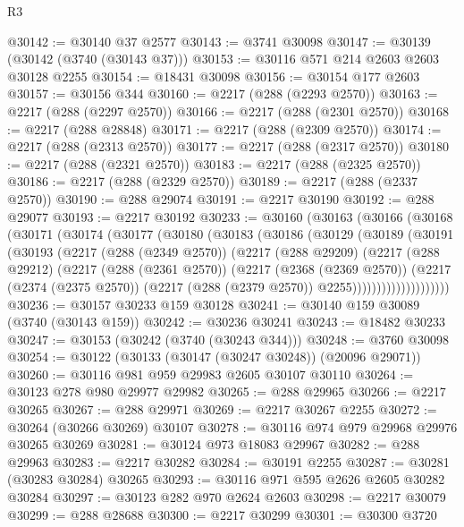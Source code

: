 \begin{lexlean}{R3}
\begin{coremodule}
@30142 := @30140 @37 @2577
@30143 := @3741 @30098
@30147 := @30139 (@30142 (@3740 (@30143 @37)))
@30153 := @30116 @571 @214 @2603 @2603 @30128 @2255
@30154 := @18431 @30098
@30156 := @30154 @177 @2603
@30157 := @30156 @344
@30160 := @2217 (@288 (@2293 @2570))
@30163 := @2217 (@288 (@2297 @2570))
@30166 := @2217 (@288 (@2301 @2570))
@30168 := @2217 (@288 @28848)
@30171 := @2217 (@288 (@2309 @2570))
@30174 := @2217 (@288 (@2313 @2570))
@30177 := @2217 (@288 (@2317 @2570))
@30180 := @2217 (@288 (@2321 @2570))
@30183 := @2217 (@288 (@2325 @2570))
@30186 := @2217 (@288 (@2329 @2570))
@30189 := @2217 (@288 (@2337 @2570))
@30190 := @288 @29074
@30191 := @2217 @30190
@30192 := @288 @29077
@30193 := @2217 @30192
@30233 := @30160
    (@30163
      (@30166
        (@30168
          (@30171
            (@30174
              (@30177
                (@30180
                  (@30183
                    (@30186
                      (@30129
                        (@30189
                          (@30191
                            (@30193
                              (@2217
                                (@288 (@2349 @2570))
                                (@2217
                                  (@288 @29209)
                                  (@2217
                                    (@288 @29212)
                                    (@2217
                                      (@288 (@2361 @2570))
                                      (@2217
                                        (@2368 (@2369 @2570))
                                        (@2217
                                          (@2374 (@2375 @2570))
                                          (@2217 (@288 (@2379 @2570)) @2255))))))))))))))))))))
@30236 := @30157 @30233 @159 @30128
@30241 := @30140 @159 @30089 (@3740 (@30143 @159))
@30242 := @30236 @30241
@30243 := @18482 @30233
@30247 := @30153 (@30242 (@3740 (@30243 @344)))
@30248 := @3760 @30098
@30254 := @30122 (@30133 (@30147 (@30247 @30248)) (@20096 @29071))
@30260 := @30116 @981 @959 @29983 @2605 @30107 @30110
@30264 := @30123 @278 @980 @29977 @29982
@30265 := @288 @29965
@30266 := @2217 @30265
@30267 := @288 @29971
@30269 := @2217 @30267 @2255
@30272 := @30264 (@30266 @30269) @30107
@30278 := @30116 @974 @979 @29968 @29976 @30265 @30269
@30281 := @30124 @973 @18083 @29967
@30282 := @288 @29963
@30283 := @2217 @30282
@30284 := @30191 @2255
@30287 := @30281 (@30283 @30284) @30265
@30293 := @30116 @971 @595 @2626 @2605 @30282 @30284
@30297 := @30123 @282 @970 @2624 @2603
@30298 := @2217 @30079
@30299 := @288 @28688
@30300 := @2217 @30299
@30301 := @30300 @3720

\end{coremodule}
\end{lexlean}
